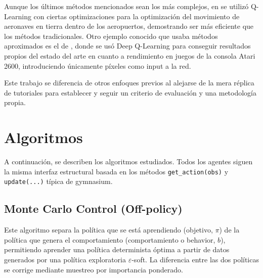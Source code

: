 Aunque los últimos métodos mencionados sean los más complejos, en \cite{qlearningtrafico} se utilizó Q-Learning con ciertas optimizaciones para la optimización del movimiento de aeronaves en tierra dentro de los aeropuertos, demostrando ser más eficiente que los métodos tradicionales. Otro ejemplo conocido que usaba métodos aproximados es el de \cite{atariDQN}, donde se usó Deep Q-Learning para conseguir resultados propios del estado del arte en cuanto a rendimiento en juegos de la consola Atari 2600, introduciendo únicamente píxeles como input a la red.

Este trabajo se diferencia de otros enfoques previos al alejarse de la mera réplica de tutoriales para establecer y seguir un criterio de evaluación y una metodología propia.

\section{Algoritmos}

A continuación, se describen los algoritmos estudiados. Todos los agentes siguen la misma interfaz estructural basada en los métodos \texttt{get\_action(obs)} y \texttt{update(...)} típica de gymnasium.

\subsection*{Monte Carlo Control (Off-policy)}
Este algoritmo separa la política que se está aprendiendo (objetivo, $\pi$) de la política que genera el comportamiento (comportamiento o behavior, $b$), permitiendo aprender una política determinista óptima a partir de datos generados por una política exploratoria $\varepsilon$-soft. La diferencia entre las dos políticas se corrige mediante muestreo por importancia ponderado.

